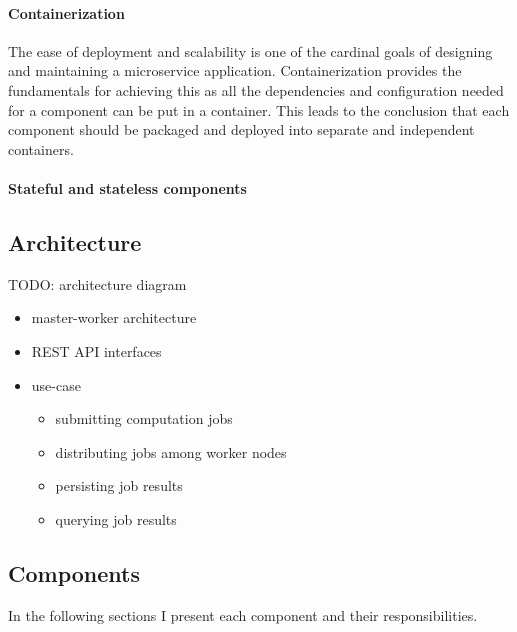 \paragraph{Containerization}The ease of deployment and scalability is one of the cardinal goals of designing and maintaining a microservice application. Containerization provides the fundamentals for achieving this as all the dependencies and configuration needed for a component can be put in a container. This leads to the conclusion that each component should be packaged and deployed into separate and independent containers.

\paragraph{Stateful and stateless components}

\subsection{Architecture}

TODO: architecture diagram

\begin{itemize}
	\item master-worker architecture
	\item REST API interfaces
	\item use-case
	\begin{itemize}
		\item submitting computation jobs
		\item distributing jobs among worker nodes
		\item persisting job results
		\item querying job results
	\end{itemize}
	
\end{itemize}


\subsection{Components}

In the following sections I present each component and their responsibilities.

